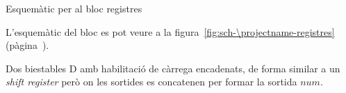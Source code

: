 \begin{contendfig}
  \begin{center}
  \end{center}
  \caption{\label{fig:sch-\projectname-registres} Esquemàtic per al bloc \textsf{registres}}
\end{contendfig}

L'esquemàtic del bloc es pot veure a la figura~\ref{fig:sch-\projectname-registres} (pàgina~\pageref{fig:sch-\projectname-registres}).

Dos biestables D amb habilitació de càrrega encadenats, de forma similar a un \emph{shift
register} però on les sortides es concatenen per formar la sortida $num$.

\vspace{1cm}
